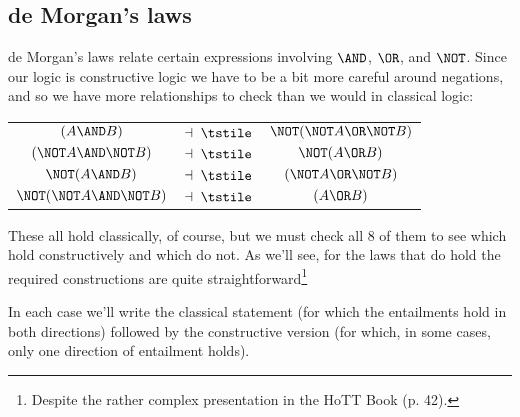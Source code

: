 \subsection{de Morgan's laws}
\label{sec:DoingLogic-deMorgan}

de Morgan's laws relate certain expressions involving $\AND$, $\OR$, and $\NOT$.  Since our logic is constructive logic we have to be a bit more careful around negations, and so we have more relationships to check than we would in classical logic:

\begin{table}[h]
\centering
\begin{tabular}{c c c }
$(A \AND B)$					&$\dashv \; \tstile$ 	&$\NOT(\NOT A \OR \NOT B)$ \\
$(\NOT A \AND \NOT B)$ 	 	&$\dashv \; \tstile$ 	&$\NOT(A \OR B)$ \\
$\NOT(A \AND B)$  				&$\dashv \; \tstile$ 	&$(\NOT A \OR \NOT B)$ \\
$\NOT (\NOT A \AND \NOT B)$	&$\dashv \; \tstile$ 	&$(A \OR B)$
\end{tabular}
\end{table}
These all hold classically, of course, but we must check all 8 of them to see which hold constructively and which do not.  As we'll see, for the laws that do hold the required constructions are quite  straightforward\footnote{
Despite the rather complex presentation in the HoTT Book (p. 42).
}

In each case we'll write the classical statement (for which the entailments hold in both directions) followed by the constructive version (for which, in some cases, only one direction of entailment holds).



